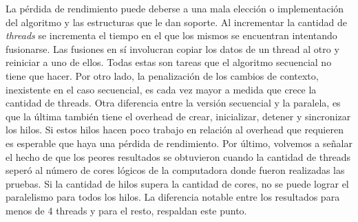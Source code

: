 La pérdida de rendimiento puede deberse a una mala elección o implementación
del algoritmo y las estructuras que le dan soporte. Al incrementar la 
cantidad de \textit{threads} se incrementa el tiempo en el que los mismos se
 encuentran intentando fusionarse. Las fusiones en sí involucran copiar los 
 datos de un thread al otro y reiniciar a uno de ellos. Todas estas son tareas 
 que el algoritmo secuencial no tiene que hacer. Por otro lado, la penalización
  de los cambios de contexto, inexistente en el caso secuencial, es cada vez 
  mayor a medida que crece la cantidad de threads.
  Otra diferencia entre la versión secuencial y la paralela, es que la última 
  también tiene el overhead de crear, inicializar, detener y sincronizar los 
  hilos. Si estos hilos hacen poco trabajo en relación al overhead que 
  requieren es esperable que haya una pérdida de rendimiento. Por último, 
  volvemos a señalar el hecho de que los peores resultados se obtuvieron 
  cuando la cantidad de threads seperó al número de cores lógicos de la 
  computadora donde fueron realizadas las pruebas. Si la cantidad de hilos 
  supera la cantidad de cores, no se puede lograr el paralelismo para todos 
  los hilos. La diferencia notable entre los resultados para menos de 4 threads
   y para el resto, respaldan este punto.
